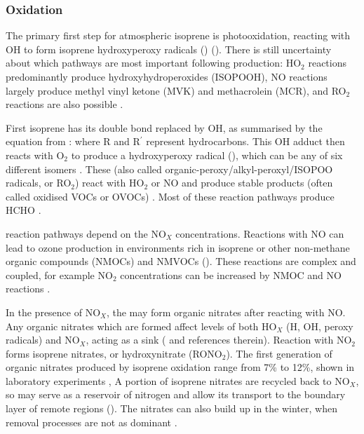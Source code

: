     \subsubsection{Oxidation}
      The primary first step for atmospheric isoprene is photooxidation, reacting with OH to form isoprene hydroxyperoxy radicals (\roo) (\cite{Wolfe2016,Marvin2017,Patchen2017}).
      There is still uncertainty about which pathways are most important following \roo production: HO$_2$ reactions predominantly produce hydroxyhydroperoxides (ISOPOOH), NO reactions largely produce methyl vinyl ketone (MVK) and methacrolein (MCR), and RO$_2$ reactions are also possible \cite{Liu2016a}.
      
      First isoprene has its double bond replaced by OH, as summarised by the equation from \cite{Patchen2007}:
      where R and R$^{\prime}$ represent hydrocarbons.
      This OH adduct then reacts with O$_2$ to produce a hydroxyperoxy radical (\roo), which can be any of six different isomers \citep{Patchen2007}.
      These \roo (also called organic-peroxy/alkyl-peroxyl/ISOPOO radicals, or RO$_2$)  react with HO$_2$ or NO and produce stable products (often called oxidised VOCs or OVOCs) \citep{Nguyen2014}.
      Most of these reaction pathways produce HCHO \citep{Wolfe2016}.
      
      \roo reaction pathways depend on the NO$_X$ concentrations.
      Reactions with NO can lead to ozone production in environments rich in isoprene or other non-methane organic compounds (NMOCs) and NMVOCs (\cite{Patchen2007,AtkinsonArey2003}).
      These reactions are complex and coupled, for example NO$_2$ concentrations can be increased by NMOC and NO reactions \citep{AtkinsonArey2003}.
          
      In the presence of NO$_X$, the \roo may form organic nitrates after reacting with NO.
      Any organic nitrates which are formed affect levels of both HO$_X$ (H, OH, peroxy radicals) and NO$_X$, acting as a sink (\cite{Mao2013} and references therein).
      Reaction with NO$_2$ forms isoprene nitrates, or hydroxynitrate (RONO$_2$).
      The first generation of organic nitrates produced by isoprene oxidation range from 7\% to 12\%, shown in laboratory experiments \citep{Paulot2009a, Mao2013},
      A portion of isoprene nitrates are recycled back to NO$_X$, so may serve as a reservoir of nitrogen and allow its transport to the boundary layer of remote regions (\cite{Patchen2007,Paulot2009a}).
      The nitrates can also build up in the winter, when removal processes are not as dominant \citep{Lelieveld2009}.
      
